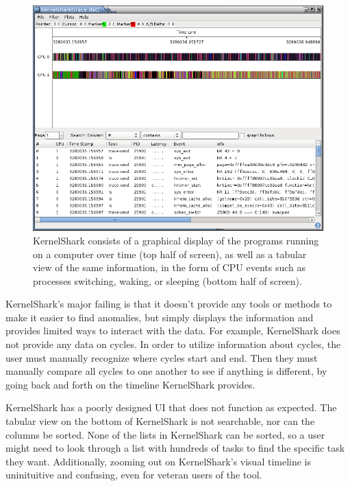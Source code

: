 \documentclass{hmcclinic}
\begin{document}
\begin{figure}[H]
  \centering
      \includegraphics[width=4.95in]{kshark-open.png}
  \caption{KernelShark consists of a graphical display of the programs running on a computer over time (top half of screen), as well as a tabular view of the same information, in the form of CPU events such as processes switching, waking, or sleeping (bottom half of screen).}
\end{figure}

KernelShark's major failing is that it doesn't provide any tools or methods to
make it easier to find anomalies, but simply displays the information and provides limited ways to interact with the data. For example, KernelShark does not provide any data on cycles. 
In order to utilize information about cycles, the
user must manually recognize where cycles start and end. Then they must manually
compare all cycles to one another to see if anything is different, by going back
and forth on the timeline KernelShark provides.

KernelShark has a poorly designed UI that does not function as
expected. The tabular view on the bottom of KernelShark is not searchable, nor
can the columns be sorted. None of the lists in KernelShark can be sorted, so a user might need to look through a list
with hundreds of tasks to find the specific task they want. Additionally, zooming out on
KernelShark's visual timeline is uninituitive and confusing, even for veteran
users of the tool.

\end{document}
